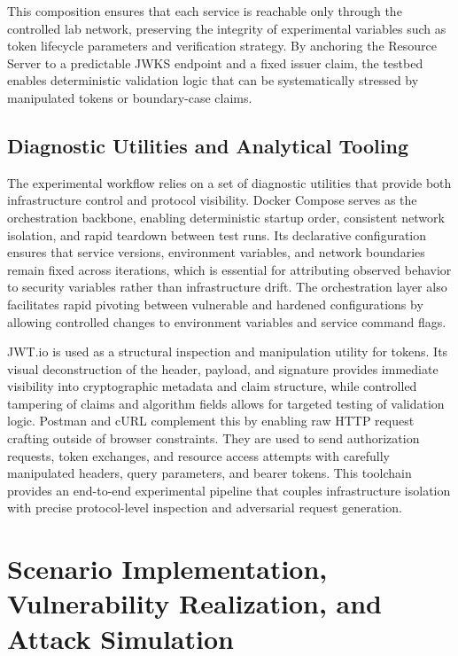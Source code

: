 \documentclass[11pt,a4paper]{report}
\begin{document}
This composition ensures that each service is reachable only through the controlled lab network, preserving the integrity of experimental variables such as token lifecycle parameters and verification strategy. By anchoring the Resource Server to a predictable JWKS endpoint and a fixed issuer claim, the testbed enables deterministic validation logic that can be systematically stressed by manipulated tokens or boundary-case claims.

\section{Diagnostic Utilities and Analytical Tooling}
\label{sec:diagnostics}
The experimental workflow relies on a set of diagnostic utilities that provide both infrastructure control and protocol visibility. Docker Compose serves as the orchestration backbone, enabling deterministic startup order, consistent network isolation, and rapid teardown between test runs. Its declarative configuration ensures that service versions, environment variables, and network boundaries remain fixed across iterations, which is essential for attributing observed behavior to security variables rather than infrastructure drift. The orchestration layer also facilitates rapid pivoting between vulnerable and hardened configurations by allowing controlled changes to environment variables and service command flags.

JWT.io is used as a structural inspection and manipulation utility for tokens. Its visual deconstruction of the header, payload, and signature provides immediate visibility into cryptographic metadata and claim structure, while controlled tampering of claims and algorithm fields allows for targeted testing of validation logic. Postman and cURL complement this by enabling raw HTTP request crafting outside of browser constraints. They are used to send authorization requests, token exchanges, and resource access attempts with carefully manipulated headers, query parameters, and bearer tokens. This toolchain provides an end-to-end experimental pipeline that couples infrastructure isolation with precise protocol-level inspection and adversarial request generation.

\chapter{Scenario Implementation, Vulnerability Realization, and Attack Simulation}
\label{chap:scenario}
\end{document}
